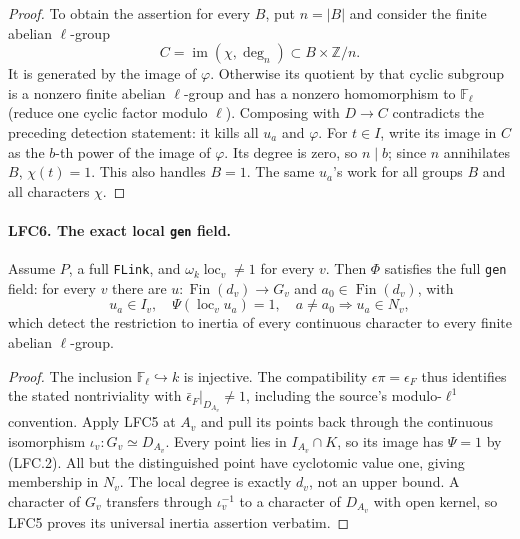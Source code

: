 \begin{proof}
To obtain the assertion for every \(B\), put \(n=|B|\) and
consider the finite abelian \(\ell\)-group
\[
             C=\operatorname{im}(\chi,\deg_n)
                       \subset B\times\mathbb Z/n.
 \]
It is generated by the image of \(\varphi\).
Otherwise its quotient by that cyclic subgroup is a nonzero
finite abelian \(\ell\)-group and has a nonzero homomorphism
to \(\mathbb F_\ell\) (reduce one cyclic factor modulo \(\ell\)).
Composing with \(D\to C\) contradicts the preceding detection
statement: it kills all \(u_a\) and \(\varphi\).
For \(t\in I\), write its image in \(C\) as the \(b\)-th
power of the image of \(\varphi\).  Its degree is zero, so
\(n\mid b\); since \(n\) annihilates \(B\), \(\chi(t)=1\).
This also handles \(B=1\).  The same \(u_a\)'s work for all
groups \(B\) and all characters \(\chi\).
\end{proof}

\paragraph{LFC6. The exact local \texttt{gen} field.}
\label{claim:LFC6}
Assume \(P\), a full \texttt{FLink}, and
\(\omega_k\operatorname{loc}_v\ne1\) for every \(v\).
Then \(\Phi\) satisfies the full \texttt{gen} field:
for every \(v\) there are \(u:\operatorname{Fin}(d_v)\to G_v\)
and \(a_0\in\operatorname{Fin}(d_v)\), with
\[
 u_a\in I_v,\quad \Psi(\operatorname{loc}_v u_a)=1,\quad
 a\ne a_0\Longrightarrow u_a\in N_v,
                                                        \tag{LFC.9}
\]
which detect the restriction to inertia of every continuous
character to every finite abelian \(\ell\)-group.

\begin{proof}
The inclusion \(\mathbb F_\ell\hookrightarrow k\) is injective.
The compatibility \(\epsilon\pi=\epsilon_F\) thus identifies
the stated nontriviality with
\(\bar\epsilon_F|_{D_{A_v}}\ne1\), including the source's
modulo-\(\ell^1\) convention.
Apply LFC5 at \(A_v\) and pull its points back through the
continuous isomorphism \(\iota_v:G_v\simeq D_{A_v}\).
Every point lies in \(I_{A_v}\cap K\), so its image has
\(\Psi=1\) by (LFC.2).  All but the distinguished point
have cyclotomic value one, giving membership in \(N_v\).
The local degree is exactly \(d_v\), not an upper bound.
A character of \(G_v\) transfers through \(\iota_v^{-1}\)
to a character of \(D_{A_v}\) with open kernel, so LFC5
proves its universal inertia assertion verbatim.
\end{proof}

